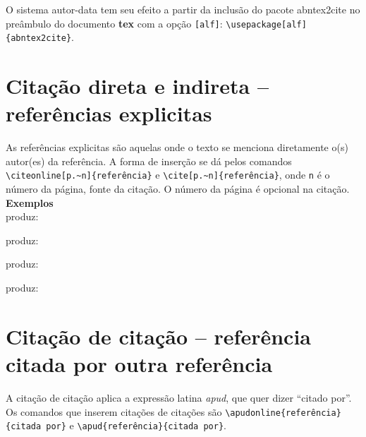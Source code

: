 \documentclass[a4paper,12pt,oneside,onecolumn,final,fleqn]{repUERJ}
\begin{document}
O sistema autor-data tem seu efeito a partir da inclusão do pacote \textsf{abntex2cite} no preâmbulo do documento \textbf{tex} com a opção \texttt{[alf]}: \texttt{\textbackslash usepackage[alf]\{abntex2cite\}}.

\section{Citação direta e indireta -- referências explicitas}

As referências explicitas são aquelas onde o texto se menciona diretamente o(s) autor(es) da referência. A forma de inserção se dá pelos comandos \texttt{\textbackslash citeonline[p.\~{}n]\{re\-fe\-rên\-cia\}} e \texttt{\textbackslash cite[p.\~{}n]\{referência\}}, onde \texttt{n} é o número da página, fonte da citação. O número da página é opcional na citação.\\

\noindent\textbf{Exemplos}\\

\noindent{} produz: 

\noindent{} produz: 

\noindent{} produz: \cite{bib:Amado1991}

\noindent{} produz: \cite[p.~320]{bib:Amado1991}


\section{Citação de citação -- referência citada por outra referência}

A citação de citação aplica a expressão latina \textsl{apud}, que quer dizer ``citado por''. Os comandos que inserem citações de citações são \texttt{\textbackslash apudonline\{referência\}\{citada por\}} e \texttt{\textbackslash apud\{referência\}\{citada por\}}.\\
\end{document}

